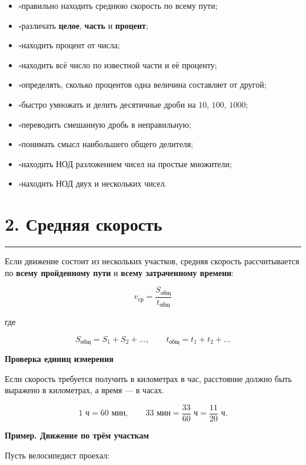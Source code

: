 \documentclass[a4paper,12pt]{article}
\newcommand{\sectionline}{%
    \vspace{0.2em}
    {\color{accent}\rule{\linewidth}{0.6pt}}
    \vspace{0.5em}
}
\newcommand{\checkitem}{\(\square\)\;}
\newcommand{\important}[1]{%
    \par\medskip
    {\color{darkaccent}\textbf{#1}}
    \par\smallskip
}
\newcommand{\exampletitle}[1]{%
    \par\medskip
    {\color{accent}\textbf{Пример. #1}}
    \par\smallskip
}
\begin{document}
\begin{itemize}[leftmargin=7mm,itemsep=3pt]
    \item \checkitem правильно находить среднюю скорость по всему пути;
    \item \checkitem различать \textbf{целое}, \textbf{часть} и \textbf{процент};
    \item \checkitem находить процент от числа;
    \item \checkitem находить всё число по известной части и её проценту;
    \item \checkitem определять, сколько процентов одна величина составляет от другой;
    \item \checkitem быстро умножать и делить десятичные дроби на \(10\), \(100\), \(1000\);
    \item \checkitem переводить смешанную дробь в неправильную;
    \item \checkitem понимать смысл наибольшего общего делителя;
    \item \checkitem находить НОД разложением чисел на простые множители;
    \item \checkitem находить НОД двух и нескольких чисел.
\end{itemize}

\section*{\color{darkaccent}2. Средняя скорость}
\sectionline

Если движение состоит из нескольких участков, средняя скорость рассчитывается по
\textbf{всему пройденному пути} и \textbf{всему затраченному времени}:

\[
\boxed{
v_{\text{ср}}
=
\frac{S_{\text{общ}}}{t_{\text{общ}}}
}
\]

где

\[
S_{\text{общ}}=S_1+S_2+\ldots,
\qquad
t_{\text{общ}}=t_1+t_2+\ldots
\]

\important{Проверка единиц измерения}

Если скорость требуется получить в километрах в час, расстояние должно быть выражено
в километрах, а время --- в часах.

\[
1\text{ ч}=60\text{ мин},
\qquad
33\text{ мин}
=
\frac{33}{60}\text{ ч}
=
\frac{11}{20}\text{ ч}.
\]

\exampletitle{Движение по трём участкам}

Пусть велосипедист проехал:
\end{document}
